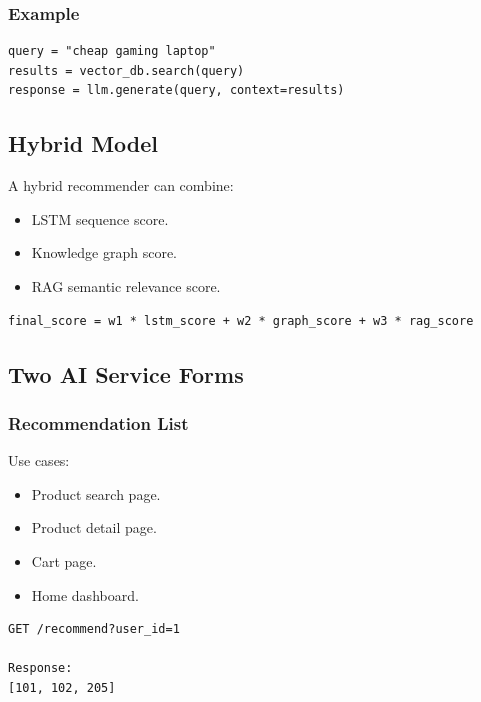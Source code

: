 \documentclass[12pt,a4paper]{article}
\begin{document}
\subsubsection{Example}

\begin{lstlisting}[caption={RAG search example.}]
query = "cheap gaming laptop"
results = vector_db.search(query)
response = llm.generate(query, context=results)
\end{lstlisting}

\subsection{Hybrid Model}

A hybrid recommender can combine:

\begin{itemize}
    \item LSTM sequence score.
    \item Knowledge graph score.
    \item RAG semantic relevance score.
\end{itemize}

\begin{lstlisting}[caption={Hybrid recommendation score.}]
final_score = w1 * lstm_score + w2 * graph_score + w3 * rag_score
\end{lstlisting}

\subsection{Two AI Service Forms}

\subsubsection{Recommendation List}

Use cases:

\begin{itemize}
    \item Product search page.
    \item Product detail page.
    \item Cart page.
    \item Home dashboard.
\end{itemize}

\begin{lstlisting}[caption={Recommendation API.}]
GET /recommend?user_id=1

Response:
[101, 102, 205]
\end{lstlisting}
\end{document}
